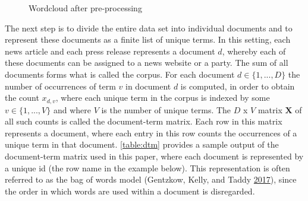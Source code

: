 \documentclass[
]{article}
\begin{document}
\begin{figure}

{\centering {}

}

\caption{Wordcloud after pre-processing \label{fig:wordclouds2}}\label{fig:wordclouds2}
\end{figure}

The next step is to divide the entire data set into individual documents
and to represent these documents as a finite list of unique terms. In
this setting, each news article and each press release represents a
document \(d\), whereby each of these documents can be assigned to a
news website or a party. The sum of all documents forms what is called
the corpus. For each document \(d \in \lbrace 1,...,D \rbrace\) the
number of occurrences of term \(v\) in document \(d\) is computed, in
order to obtain the count \(x_{d,v}\), where each unique term in the
corpus is indexed by some \(v \in \lbrace 1,...,V \rbrace\) and where
\(V\) is the number of unique terms. The \(D\) x \(V\) matrix
\(\boldsymbol{X}\) of all such counts is called the document-term
matrix. Each row in this matrix represents a document, where each entry
in this row counts the occurrences of a unique term in that document.
\autoref{table:dtm} provides a sample output of the document-term matrix
used in this paper, where each document is represented by a unique id
(the row name in the example below). This representation is often
referred to as the bag of words model (Gentzkow, Kelly, and Taddy
\protect\hyperlink{ref-gentzkow_text_2017}{2017}), since the order in
which words are used within a document is disregarded.
\end{document}
